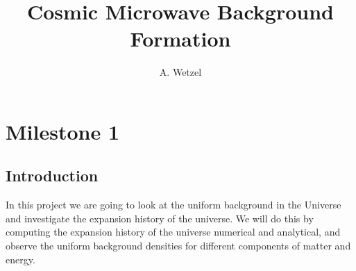 \documentclass{aa}
\begin{document}
 
    

   \title{Cosmic Microwave Background Formation}


   \author{A. Wetzel
          }


   \date{}

 
  


   \maketitle
%
\section{Milestone 1}
\subsection{Introduction}
In this project we are going to look at the uniform background in the Universe and investigate the expansion history of the universe. We will do this by computing the expansion history of the universe numerical and analytical, and observe the uniform background densities for different components of matter and energy.  
\end{document}
